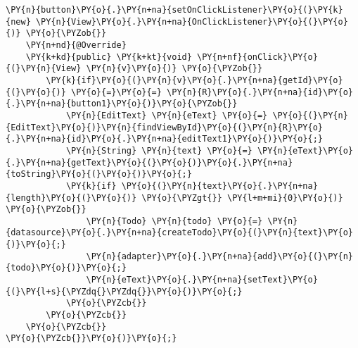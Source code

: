 \begin{Verbatim}[commandchars=\\\{\}]
\PY{n}{button}\PY{o}{.}\PY{n+na}{setOnClickListener}\PY{o}{(}\PY{k}{new} \PY{n}{View}\PY{o}{.}\PY{n+na}{OnClickListener}\PY{o}{(}\PY{o}{)} \PY{o}{\PYZob{}}
    \PY{n+nd}{@Override}
    \PY{k+kd}{public} \PY{k+kt}{void} \PY{n+nf}{onClick}\PY{o}{(}\PY{n}{View} \PY{n}{v}\PY{o}{)} \PY{o}{\PYZob{}}
        \PY{k}{if}\PY{o}{(}\PY{n}{v}\PY{o}{.}\PY{n+na}{getId}\PY{o}{(}\PY{o}{)} \PY{o}{=}\PY{o}{=} \PY{n}{R}\PY{o}{.}\PY{n+na}{id}\PY{o}{.}\PY{n+na}{button1}\PY{o}{)}\PY{o}{\PYZob{}}
            \PY{n}{EditText} \PY{n}{eText} \PY{o}{=} \PY{o}{(}\PY{n}{EditText}\PY{o}{)}\PY{n}{findViewById}\PY{o}{(}\PY{n}{R}\PY{o}{.}\PY{n+na}{id}\PY{o}{.}\PY{n+na}{editText1}\PY{o}{)}\PY{o}{;}
            \PY{n}{String} \PY{n}{text} \PY{o}{=} \PY{n}{eText}\PY{o}{.}\PY{n+na}{getText}\PY{o}{(}\PY{o}{)}\PY{o}{.}\PY{n+na}{toString}\PY{o}{(}\PY{o}{)}\PY{o}{;}
            \PY{k}{if} \PY{o}{(}\PY{n}{text}\PY{o}{.}\PY{n+na}{length}\PY{o}{(}\PY{o}{)} \PY{o}{\PYZgt{}} \PY{l+m+mi}{0}\PY{o}{)} \PY{o}{\PYZob{}}
                \PY{n}{Todo} \PY{n}{todo} \PY{o}{=} \PY{n}{datasource}\PY{o}{.}\PY{n+na}{createTodo}\PY{o}{(}\PY{n}{text}\PY{o}{)}\PY{o}{;}
           	    \PY{n}{adapter}\PY{o}{.}\PY{n+na}{add}\PY{o}{(}\PY{n}{todo}\PY{o}{)}\PY{o}{;}
           	    \PY{n}{eText}\PY{o}{.}\PY{n+na}{setText}\PY{o}{(}\PY{l+s}{\PYZdq{}\PYZdq{}}\PY{o}{)}\PY{o}{;}
            \PY{o}{\PYZcb{}}
        \PY{o}{\PYZcb{}}
    \PY{o}{\PYZcb{}}
\PY{o}{\PYZcb{}}\PY{o}{)}\PY{o}{;}
\end{Verbatim}

